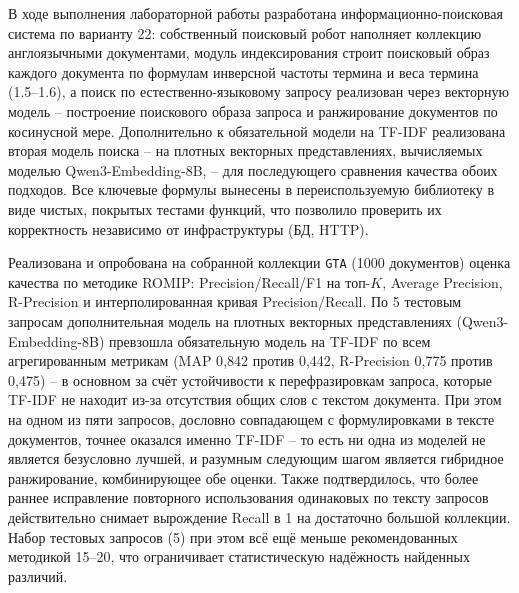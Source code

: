 

В ходе выполнения лабораторной работы разработана информационно-поисковая
система по варианту 22: собственный поисковый робот наполняет коллекцию
англоязычными документами, модуль индексирования строит поисковый образ
каждого документа по формулам инверсной частоты термина и веса термина
(1.5--1.6), а поиск по естественно-языковому запросу реализован через
векторную модель -- построение поискового образа запроса и ранжирование
документов по косинусной мере. Дополнительно к обязательной модели на
TF-IDF реализована вторая модель поиска -- на плотных векторных
представлениях, вычисляемых моделью Qwen3-Embedding-8B, -- для
последующего сравнения качества обоих подходов. Все ключевые формулы
вынесены в переиспользуемую библиотеку в виде чистых, покрытых тестами
функций, что позволило проверить их корректность независимо от
инфраструктуры (БД, HTTP).

Реализована и опробована на собранной коллекции \texttt{GTA} (1000
документов) оценка качества по методике ROMIP: Precision/Recall/F1 на
топ-$K$, Average Precision, R-Precision и интерполированная кривая
Precision/Recall. По 5 тестовым запросам дополнительная модель на
плотных векторных представлениях (Qwen3-Embedding-8B) превзошла
обязательную модель на TF-IDF по всем агрегированным метрикам (MAP
0{,}842 против 0{,}442, R-Precision 0{,}775 против 0{,}475) -- в
основном за счёт устойчивости к перефразировкам запроса, которые TF-IDF
не находит из-за отсутствия общих слов с текстом документа. При этом на
одном из пяти запросов, дословно совпадающем с формулировками в тексте
документов, точнее оказался именно TF-IDF -- то есть ни одна из моделей
не является безусловно лучшей, и разумным следующим шагом является
гибридное ранжирование, комбинирующее обе оценки. Также подтвердилось,
что более раннее исправление повторного использования одинаковых по
тексту запросов действительно снимает вырождение Recall в 1 на
достаточно большой коллекции. Набор тестовых запросов (5) при этом
всё ещё меньше рекомендованных методикой 15--20, что ограничивает
статистическую надёжность найденных различий.
